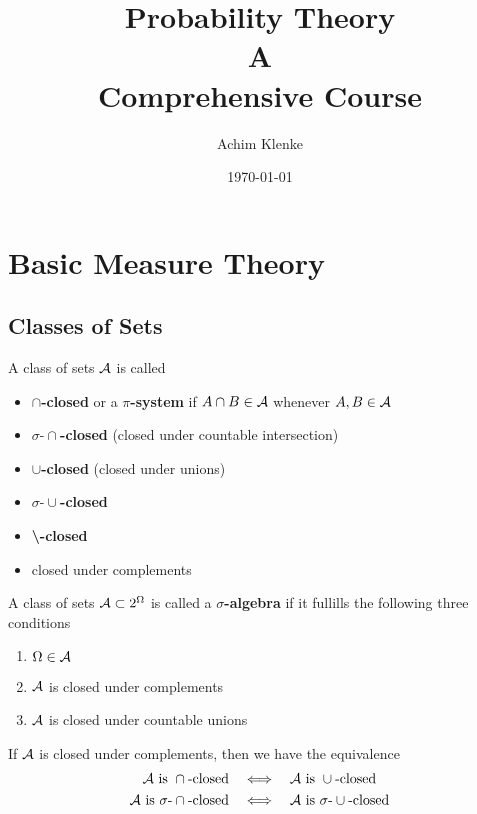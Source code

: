 \documentclass[11pt]{article}
\author{Achim Klenke}
\date{\today}
\title{\aunclfamily\Huge Probability Theory\\ A \\Comprehensive Course}
\begin{document}
\maketitle \clearpage
\tableofcontents \clearpage\section{Basic Measure Theory}
\label{sec:orgcf3b0c5}
\subsection{Classes of Sets}
\label{sec:orgf987b47}
\begin{definition}[]
A class of sets \(\mathcal{A}\) is called
\begin{itemize}
\item \textbf{\(\cap\)-closed} or a \textbf{\(\pi\)-system} if \(A\cap B\in\mathcal{A}\) whenever \(A,B\in\mathcal{A}\)
\item \textbf{\(\sigma\text{-}\cap\)-closed} (closed under countable intersection)
\item \textbf{\(\cup\)-closed} (closed under unions)
\item \textbf{\(\sigma\text{-}\cup\)-closed}
\item \textbf{\textbackslash-closed}
\item closed under complements
\end{itemize}
\end{definition}

\begin{definition}
A class of sets \(\mathcal{A}\subset 2^{\Omega}\) is called a \textbf{\(\sigma\)-algebra} if it
fullills the following three conditions
\begin{enumerate}
\item \(\Omega\in\mathcal{A}\)
\item \(\mathcal{A}\) is closed under complements
\item \(\mathcal{A}\) is closed under countable unions
\end{enumerate}
\end{definition}


\begin{theorem}[]
If \(\mathcal{A}\) is closed under complements, then we have the equivalence
\begin{align*}
\mathcal{A}\text{ is }\cap\text{-closed}\quad&\Longleftrightarrow\quad\mathcal{A}\text{ is }
\cup\text{-closed}\\
\mathcal{A}\text{ is }\sigma\text{-}\cap\text{-closed}\quad&\Longleftrightarrow\quad\mathcal{A}\text{ is }
\sigma\text{-}\cup\text{-closed}
\end{align*}
\end{theorem}
\end{document}
